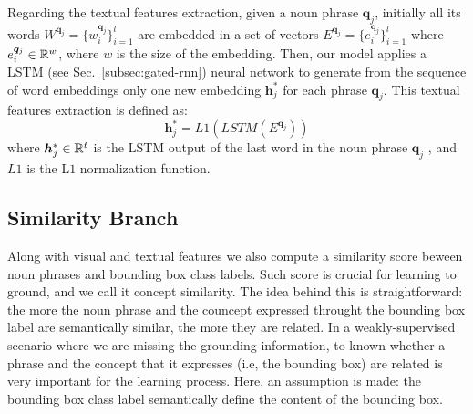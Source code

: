 Regarding the textual features extraction, given a noun phrase
$\bm{q}_j$, initially all its words $W^{\bm{q}_j} = \{ w^{\bm{q}_j}_i
\}^l_{i=1}$ are embedded in a set of vectors $E^{\bm{q}_j} =
\{e^{\bm{q}_j}_i \}^l_{i=1}$ where $e^{\bm{q}_j}_i \in \mathbb{R}^w$, where
$w$ is the size of the embedding. Then, our model applies a LSTM (see
Sec.~\ref{subsec:gated-rnn}) neural network to generate from the
sequence of word embeddings only one new embedding $\bm{h}^*_j$ for
each phrase $\bm{q}_j$. This textual features extraction is defined
as:
\begin{equation}
  \bm{h}^*_j = L1(LSTM(E^{\bm{q}_j}))
\end{equation}
where $\bm{h}^*_j \in \mathbb{R}^t$ is the LSTM output of the last word in
the noun phrase $\bm{q}_j$ , and $L1$ is the L$1$ normalization
function.

\subsection{Similarity Branch}

Along with visual and textual features we also compute a similarity
score beween noun phrases and bounding box class labels. Such score is
crucial for learning to ground, and we call it concept similarity. The
idea behind this is straightforward: the more the noun phrase and the
councept expressed throught the bounding box label are semantically
similar, the more they are related. In a weakly-supervised scenario
where we are missing the grounding information, to known whether a
phrase and the concept that it expresses (i.e, the bounding box) are
related is very important for the learning process. Here, an
assumption is made: the bounding box class label semantically define
the content of the bounding box. 

